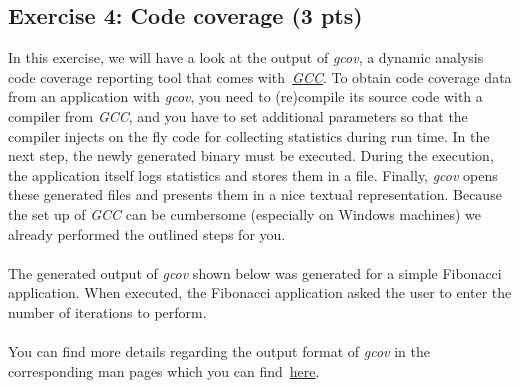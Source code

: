 \documentclass [11pt, a4wide, twoside]{article}
\begin{document}
\subsection*{Exercise 4: Code coverage (3 pts)}
In this exercise, we will have a look at the output of \emph{gcov}, a dynamic analysis code coverage reporting tool that comes with~\href{https://gcc.gnu.org/}{\emph{GCC}}. To obtain code coverage data from an application with \emph{gcov}, you need to (re)compile its source code with a compiler from \emph{GCC}, and you have to set additional parameters so that the compiler injects on the fly code for collecting statistics during run time. In the next step, the newly generated binary must be executed. During the execution, the application itself logs statistics and stores them in a file. Finally, \emph{gcov} opens these generated files and presents them in a nice textual representation. Because the set up of \emph{GCC} can be cumbersome (especially on Windows machines) we already performed the outlined steps for you.\\\\
The generated output of \emph{gcov} shown below was generated for a simple Fibonacci application. When executed, the Fibonacci application asked the user to enter the number of iterations to perform.\\\\
You can find more details regarding the output format of \emph{gcov} in the corresponding man pages which you can find~\href{https://www.man7.org/linux/man-pages/man1/gcov.1.html}{here}.\\\\
\end{document}
